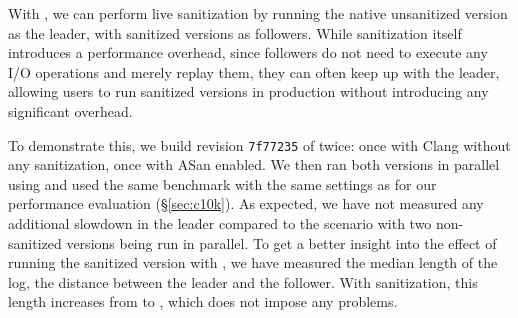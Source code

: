 With \varan, we can perform live sanitization by running the native
unsanitized version as the leader, with sanitized versions as
followers.%
While sanitization itself introduces a performance overhead, since
followers do not need to execute any I/O operations and merely replay
them, they can often keep up with the leader, allowing users to run
sanitized versions in production without introducing any significant
overhead.

To demonstrate this, we build revision \lstinline`7f77235` of \redis
twice: once with Clang without any sanitization, once with ASan
enabled.  We then ran both versions in parallel using \varan and used
the same benchmark with the same settings as for our performance
evaluation (\S\ref{sec:c10k}). As expected, we have not measured any
additional slowdown in the leader compared to the scenario with two
non-sanitized versions being run in parallel. To get a better insight
into the effect of running the sanitized version with \varan, we have
measured the median length of the log, \ie the distance between the
leader and the follower. With sanitization, this length increases from
\redisNoSanitizationMedianLength to \redisSanitizationMedianLength,
which does not impose any problems.
